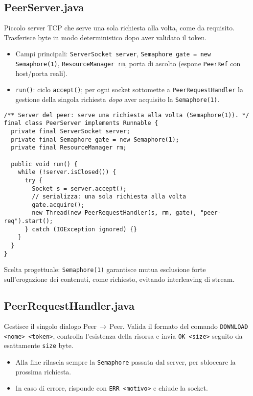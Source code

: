 \documentclass[a4paper,12pt]{article}
\begin{document}
\subsection*{PeerServer.java}
Piccolo server TCP che serve una sola richiesta alla volta, come da requisito. Trasferisce byte in modo deterministico dopo aver validato il token.
\begin{itemize}[nosep]
  \item Campi principali: \texttt{ServerSocket server}, \texttt{Semaphore gate = new Semaphore(1)}, \texttt{ResourceManager rm}, porta di ascolto (espone \texttt{PeerRef} con host/porta reali).
  \item \texttt{run()}: ciclo \texttt{accept()}; per ogni socket sottomette a \texttt{PeerRequestHandler} la gestione della singola richiesta \emph{dopo} aver acquisito la \texttt{Semaphore(1)}.
\end{itemize}

\begin{lstlisting}
/** Server del peer: serve una richiesta alla volta (Semaphore(1)). */
final class PeerServer implements Runnable {
  private final ServerSocket server;
  private final Semaphore gate = new Semaphore(1);
  private final ResourceManager rm;

  public void run() {
    while (!server.isClosed()) {
      try {
        Socket s = server.accept();
        // serializza: una sola richiesta alla volta
        gate.acquire();
        new Thread(new PeerRequestHandler(s, rm, gate), "peer-req").start();
      } catch (IOException ignored) {}
    }
  }
}
\end{lstlisting}

Scelta progettuale: \texttt{Semaphore(1)} garantisce mutua esclusione forte sull'erogazione dei contenuti, come richiesto, evitando interleaving di stream.

\subsection*{PeerRequestHandler.java}
Gestisce il singolo dialogo Peer\,$\rightarrow$\,Peer. Valida il formato del comando \texttt{DOWNLOAD <nome> <token>}, controlla l’esistenza della risorsa e invia \texttt{OK <size>} seguito da esattamente \texttt{size} byte.
\begin{itemize}[nosep]
  \item Alla fine rilascia sempre la \texttt{Semaphore} passata dal server, per sbloccare la prossima richiesta.
  \item In caso di errore, risponde con \texttt{ERR <motivo>} e chiude la socket.
\end{itemize}
\end{document}
